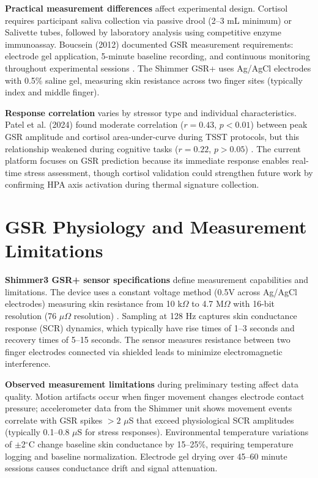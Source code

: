 \textbf{Practical measurement differences} affect experimental design. Cortisol requires participant saliva collection via passive drool (2--3 mL minimum) or Salivette tubes, followed by laboratory analysis using competitive enzyme immunoassay. Boucsein (2012) documented GSR measurement requirements: electrode gel application, 5-minute baseline recording, and continuous monitoring throughout experimental sessions \cite{ref1}. The Shimmer GSR+ uses Ag/AgCl electrodes with 0.5\% saline gel, measuring skin resistance across two finger sites (typically index and middle finger).

\textbf{Response correlation} varies by stressor type and individual characteristics. Patel et al. (2024) found moderate correlation ($r = 0.43$, $p < 0.01$) between peak GSR amplitude and cortisol area-under-curve during TSST protocols, but this relationship weakened during cognitive tasks ($r = 0.22$, $p > 0.05$) \cite{ref7}. The current platform focuses on GSR prediction because its immediate response enables real-time stress assessment, though cortisol validation could strengthen future work by confirming HPA axis activation during thermal signature collection.

\section{GSR Physiology and Measurement Limitations}
\textbf{Shimmer3 GSR+ sensor specifications} define measurement capabilities and limitations. The device uses a constant voltage method (0.5V across Ag/AgCl electrodes) measuring skin resistance from 10 k$\Omega$ to 4.7 M$\Omega$ with 16-bit resolution (76 $\mu\Omega$ resolution) \cite{ref8}. Sampling at 128 Hz captures skin conductance response (SCR) dynamics, which typically have rise times of 1--3 seconds and recovery times of 5--15 seconds. The sensor measures resistance between two finger electrodes connected via shielded leads to minimize electromagnetic interference.

\textbf{Observed measurement limitations} during preliminary testing affect data quality. Motion artifacts occur when finger movement changes electrode contact pressure; accelerometer data from the Shimmer unit shows movement events correlate with GSR spikes $>2$ $\mu$S that exceed physiological SCR amplitudes (typically 0.1--0.8 $\mu$S for stress responses). Environmental temperature variations of $\pm$2$^\circ$C change baseline skin conductance by 15--25\%, requiring temperature logging and baseline normalization. Electrode gel drying over 45--60 minute sessions causes conductance drift and signal attenuation.

